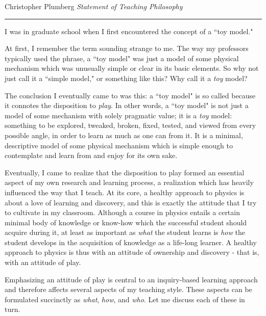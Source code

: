 \documentclass[12pt, tightenlines, onecolumn, showpacs, amsfonts, aps, prc, nofootinbib, floatfix]{revtex4-2}
\begin{document}
\large
\noindent Christopher Plumberg%
\hfill%
\textit{Statement of Teaching Philosophy}%
\vspace{-12.5pt}
\rule{\columnwidth}{1pt}

\medskip

\normalsize


I was in graduate school when I first encountered the concept of a ``toy model."

\medskip

At first, I remember the term sounding strange to me.  The way my professors typically used the phrase, a ``toy model" was just a model of some physical mechanism which was unusually simple or clear in its basic elements.  So why not just call it a ``simple model," or something like this?  Why call it a \textit{toy} model?

\medskip

The conclusion I eventually came to was this: a ``toy model" is so called because it connotes the disposition to \textit{play}.  In other words, a ``toy model" is not just a model of some mechanism with solely pragmatic value; it is a \textit{toy} model: something to be explored, tweaked, broken, fixed, tested, and viewed from every possible angle, in order to learn as much as one can from it.  It is a minimal, descriptive model of some physical mechanism which is simple enough to contemplate and learn from and enjoy for its own sake.

\medskip

Eventually, I came to realize that the disposition to play formed an essential aspect of my own research and learning process, a realization which has heavily influenced the way that I teach.  At its core, a healthy approach to physics is about a love of learning and discovery, and this is exactly the attitude that I try to cultivate in my classroom.  Although a course in physics entails a certain minimal body of knowledge or know-how which the successful student should acquire during it, at least as important as \textit{what} the student learns is \textit{how} the student develops in the acquisition of knowledge as a life-long learner.  A healthy approach to physics is thus with an attitude of ownership and discovery - that is, with an attitude of play.

\medskip

Emphasizing an attitude of play is central to an inquiry-based learning approach and therefore affects several aspects of my teaching style.  These aspects can be formulated succinctly as \textit{what}, \textit{how}, and \textit{who}.  Let me discuss each of these in turn. 
\end{document}
